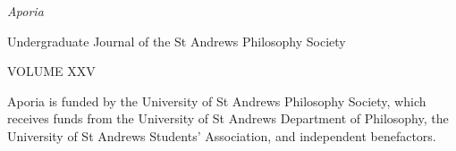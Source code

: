 \begin{center}
    \vspace*{7cm}
    
    {\huge\textit{Aporia}}

        \vspace{3cm}
    \normalsize
    Undergraduate Journal of the St Andrews Philosophy Society

    \vspace{1cm}
    VOLUME XXV
\end{center}

\vfill 

\noindent Aporia is funded by the University of St Andrews Philosophy
Society, which receives funds from the University of St Andrews
Department of Philosophy, the University of St Andrews Students’
Association, and independent benefactors.
